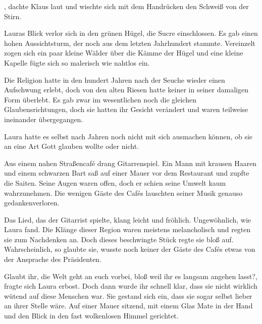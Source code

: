 \par

, dachte Klaus laut und wischte sich mit dem Handrücken den Schweiß von der Stirn.

\par

Lauras Blick verlor sich in den grünen Hügel, die Sucre einschlossen. Es gab einen hohen Aussichtsturm, der noch aus dem letzten Jahrhundert stammte. Vereinzelt zogen sich ein paar kleine Wälder über die Kämme der Hügel und eine kleine Kapelle fügte sich so malerisch wie nahtlos ein.

\par

Die Religion hatte in den hundert Jahren nach der Seuche wieder einen Aufschwung erlebt, doch von den alten Riesen hatte keiner in seiner damaligen Form überlebt. Es gab zwar im wesentlichen noch die gleichen Glaubensrichtungen, doch sie hatten ihr Gesicht verändert und waren teilweise ineinander übergegangen.

\par

Laura hatte es selbst nach Jahren noch nicht mit sich ausmachen können, ob sie an eine Art Gott glauben wollte oder nicht.

\par

Aus einem nahen Straßencafé drang Gitarrenspiel. Ein Mann mit krausen Haaren und einem schwarzen Bart saß auf einer Mauer vor dem Restaurant und zupfte die Saiten. Seine Augen waren offen, doch er schien seine Umwelt kaum wahrzunehmen. Die wenigen Gäste des Cafés lauschten seiner Musik genauso gedankenverloren.

\par

Das Lied, das der Gitarrist spielte, klang leicht und fröhlich. Ungewöhnlich, wie Laura fand. Die Klänge dieser Region waren meistens melancholisch und regten sie zum Nachdenken an. Doch dieses beschwingte Stück regte sie bloß auf. Wahrscheinlich, so glaubte sie, wusste noch keiner der Gäste des Cafés etwas von der Ansprache des Präsidenten.

\par

Glaubt ihr, die Welt geht an euch vorbei, bloß weil ihr es langsam angehen lasst?, fragte sich Laura erbost. Doch dann wurde ihr schnell klar, dass sie nicht wirklich wütend auf diese Menschen war. Sie gestand sich ein, dass sie sogar selbst lieber an ihrer Stelle wäre. Auf einer Mauer sitzend, mit einem Glas Mate in der Hand und den Blick in den fast wolkenlosen Himmel gerichtet.

